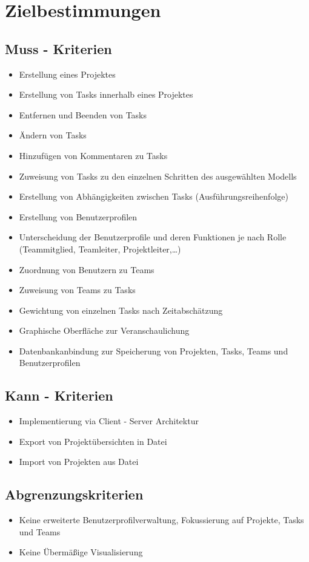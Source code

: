 
\section{Zielbestimmungen}

\subsection{Muss - Kriterien}
\begin{itemize}
	\item Erstellung eines Projektes
	\item Erstellung von Tasks innerhalb eines Projektes
	\item Entfernen und Beenden von Tasks
	\item Ändern von Tasks
	\item Hinzufügen von Kommentaren zu Tasks
	\item Zuweisung von Tasks zu den einzelnen Schritten des ausgewählten Modells
	\item Erstellung von Abhängigkeiten zwischen Tasks (Ausführungsreihenfolge)
	\item Erstellung von Benutzerprofilen
	\item Unterscheidung der Benutzerprofile und deren Funktionen je nach Rolle \\ (Teammitglied, Teamleiter, Projektleiter,\dots)
	\item Zuordnung von Benutzern zu Teams
	\item Zuweisung von Teams zu Tasks
	\item Gewichtung von einzelnen Tasks nach Zeitabschätzung
	\item Graphische Oberfläche zur Veranschaulichung
	\item Datenbankanbindung zur Speicherung von Projekten, Tasks, Teams und Benutzerprofilen
\end{itemize}

\subsection{Kann - Kriterien}
	\begin{itemize}
		\item Implementierung via Client - Server Architektur
		\item Export von Projektübersichten in Datei
		\item Import von Projekten aus Datei
	\end{itemize}

\subsection{Abgrenzungskriterien}
\begin{itemize}
	\item Keine erweiterte Benutzerprofilverwaltung, Fokussierung auf Projekte, Tasks und Teams
	\item Keine Übermäßige Visualisierung
\end{itemize}
